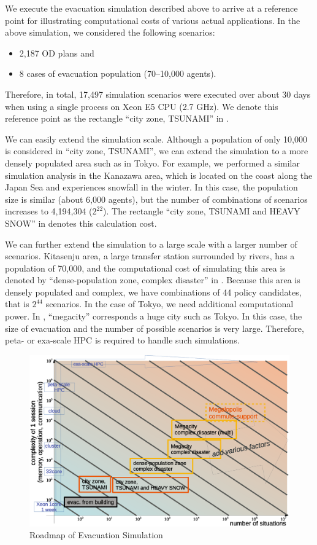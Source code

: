 We execute the evacuation simulation described above to arrive at
a reference point for illustrating computational costs of various
actual applications.
In the above simulation, we considered the following scenarios:
\begin{itemize}
  \item 2,187 OD plans and
  \item 8 cases of evacuation population (70--10,000 agents).
\end{itemize}
Therefore, in total, 17,497 simulation scenarios were executed
over about 30 days when using a single process on Xeon E5 CPU (2.7 GHz).
We denote this reference point as the rectangle
``city zone, TSUNAMI'' in .

We can easily extend the simulation scale.
Although a population of only 10,000 is considered in ``city zone, TSUNAMI'',
we can extend the simulation to a more densely populated area such as in Tokyo.
For example,
we performed a similar simulation analysis in the Kanazawa area,
which is located on the coast along the Japan Sea and
experiences snowfall in the winter.
In this case, the population size is similar (about 6,000 agents),
but the number of combinations of scenarios increases to 4,194,304 ($2^{22}$).
The rectangle ``city zone, TSUNAMI and HEAVY SNOW'' in 
 denotes this calculation cost.

We can further extend the simulation to a large scale with a larger number of
scenarios.
Kitasenju area, a large transfer station surrounded by rivers,
has a population of 70,000, and the computational cost of simulating this area is
denoted by ``dense-population zone, complex disaster'' in .
Because this area is densely populated and complex, 
we have combinations of 44 policy candidates,
that is $2^{44}$ scenarios.
In the case of Tokyo, we need additional computational power.
In , ``megacity'' corresponds a huge
city such as Tokyo.  In this case, the size of evacuation and the
number of possible scenarios is very large.
Therefore, peta- or exa-scale HPC is required to handle such
simulations.

\begin{figure}
  \centering
  \includegraphics[width=.60\linewidth]{Figs.noda/figure2-4.eps}
  \caption{Roadmap of Evacuation Simulation}
  \label{fig:Figure-4}
\end{figure}

